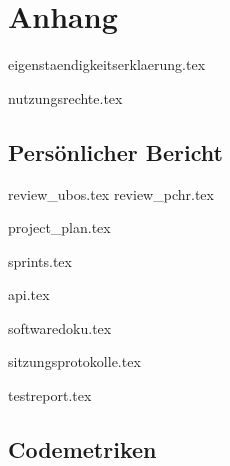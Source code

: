 \part*{Anhang}

\begin{comment}
In den Anhang gehört: Formulare (z.B. Eigenständigkeitserklärung, Nutzungsrechte, ...), Persönliche Reflektion, Projektplanung inkl. Risiko-Listen (Dokumentation der Versionen nach jeder Iteration), Zeitabrechnung nach sinnvollen Kategorien, Sitzungsprotokolle - das sind alles HSR-internen, nicht publizierte Dokumentationselemente (Abgabe nur für die Bewertung und Archivierung, in einer PDF-Datei)
\end{comment}

{eigenstaendigkeitserklaerung.tex}

{nutzungsrechte.tex}

\chapter{Persönlicher Bericht}
{review_ubos.tex}
{review_pchr.tex}

{project_plan.tex}

{sprints.tex}

{api.tex}

{softwaredoku.tex}

{sitzungsprotokolle.tex}

{testreport.tex}

\chapter{Codemetriken} \label{appendix:code-metrics}

\xxx[]